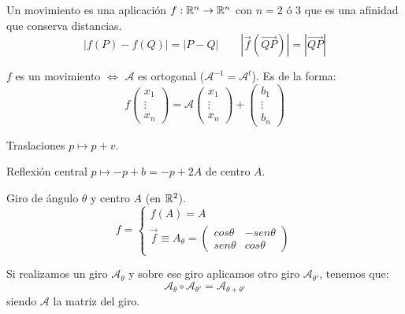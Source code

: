 \begin{ndef}[Movimientos]
  Un movimiento es una aplicación $f:\mathbb{R}^n \to \mathbb{R}^n$ con $n= 2$ ó $3$ que es una afinidad que conserva distancias.
  \[
    |f(P)-f(Q)|= |P-Q| \quad  \quad |\vec{f}(\vec{QP})|= |\vec{QP}|
  \]
\end{ndef}

\begin{nprop}
  $f$ es un movimiento $\iff$ $\mathcal A$ es ortogonal ($\mathcal A ^{-1}= \mathcal A ^t$). Es de la forma:
  \[
    f \begin{pmatrix}
      x_1\\
      \vdots\\
      x_n
    \end{pmatrix} = \mathcal A \begin{pmatrix}
      x_1\\
      \vdots\\
      x_n
    \end{pmatrix} + \begin{pmatrix}
      b_1\\
      \vdots\\
      b_n
    \end{pmatrix}
  \]
\end{nprop}


\begin{ejemplo}\hfill
  \begin{nlist}
  \item Traslaciones $p \mapsto p+v$.
  \item Reflexión central $p \mapsto -p +b= -p +2A$ de centro $A$.
  \item Giro de ángulo $\theta$ y centro $A$ (en $\mathbb{R}^2$).
    \[
      f= \begin{cases}
	f(A) = A \\
	\vec{f} \equiv A_{\theta} = \begin{pmatrix}
          cos \theta & -sen \theta\\
          sen \theta & cos \theta
        \end{pmatrix}
      \end{cases}
    \]
  \end{nlist}
\end{ejemplo}

\begin{nprop}
  Si realizamos un giro $\mathcal A_\theta$ y sobre ese giro aplicamos otro giro $\mathcal A_{\theta'}$, tenemos que:
  \[
    \mathcal A_{\theta} \circ \mathcal A_{\theta'} = \mathcal A_{\theta+\theta'}
  \]
  siendo $\mathcal A$ la matriz del giro.
\end{nprop}

